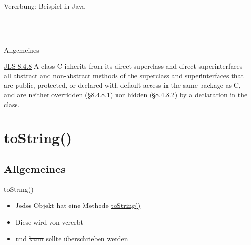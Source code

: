 \documentclass[usepdftitle=false,hyperref={pdfpagelabels=false}]{beamer}
\begin{document}

\begin{frame}{Vererbung: Beispiel in Java}
    \begin{minipage}[b]{0.45\linewidth}
        \inputminted[linenos=false, numbersep=5pt, tabsize=4, fontsize=\tiny, label=Animal.java, frame=lines]{java}{Animal.java}
        \inputminted[linenos=false, numbersep=5pt, tabsize=4, fontsize=\tiny, label=Jungle.java, frame=lines]{java}{Jungle.java}
    \end{minipage}
    \hspace{0.5cm}
    \begin{minipage}[b]{0.45\linewidth}
        \inputminted[linenos=false, numbersep=5pt, tabsize=4, fontsize=\tiny, label=Tiger.java, frame=lines]{java}{Tiger.java}
        \inputminted[linenos=false, numbersep=5pt, tabsize=4, fontsize=\tiny, label=Cat.java, frame=lines]{java}{Cat.java}
    \end{minipage}
\end{frame}

\begin{frame}{Allgemeines}
    \begin{block}{\href{http://docs.oracle.com/javase/specs/jls/se7/html/jls-8.html\#jls-8.4.8}{JLS 8.4.8}}
    A class C inherits from its direct superclass and direct
    superinterfaces all abstract and non-abstract methods of the
    superclass and superinterfaces that are public, protected, or
    declared with default access in the same package as C, and are
    neither overridden (§8.4.8.1) nor hidden (§8.4.8.2) by a
    declaration in the class.
    \end{block}
\end{frame}

\section{toString()}
\subsection{Allgemeines}
\begin{frame}{toString()}
    \begin{itemize}[<+->]
        \item Jedes Objekt hat eine Methode \href{http://docs.oracle.com/javase/7/docs/api/java/lang/Object.html\#toString()}{toString()}
        \item Diese wird von  vererbt
        \item und \st{kann} sollte überschrieben werden
    \end{itemize}
\end{frame}
\end{document}
